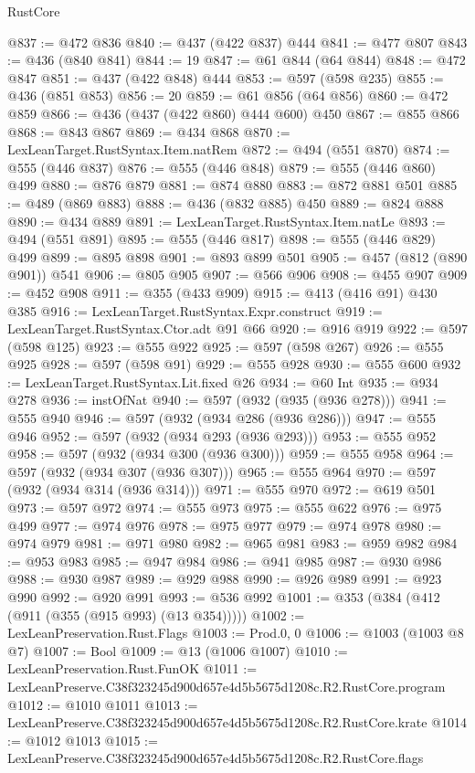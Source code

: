 \begin{lexlean}{RustCore}
\begin{coremodule}
@837 := @472 @836
@840 := @437 (@422 @837) @444
@841 := @477 @807
@843 := @436 (@840 @841)
@844 := 19
@847 := @61 @844 (@64 @844)
@848 := @472 @847
@851 := @437 (@422 @848) @444
@853 := @597 (@598 @235)
@855 := @436 (@851 @853)
@856 := 20
@859 := @61 @856 (@64 @856)
@860 := @472 @859
@866 := @436 (@437 (@422 @860) @444 @600) @450
@867 := @855 @866
@868 := @843 @867
@869 := @434 @868
@870 := LexLeanTarget.RustSyntax.Item.natRem
@872 := @494 (@551 @870)
@874 := @555 (@446 @837)
@876 := @555 (@446 @848)
@879 := @555 (@446 @860) @499
@880 := @876 @879
@881 := @874 @880
@883 := @872 @881 @501
@885 := @489 (@869 @883)
@888 := @436 (@832 @885) @450
@889 := @824 @888
@890 := @434 @889
@891 := LexLeanTarget.RustSyntax.Item.natLe
@893 := @494 (@551 @891)
@895 := @555 (@446 @817)
@898 := @555 (@446 @829) @499
@899 := @895 @898
@901 := @893 @899 @501
@905 := @457 (@812 (@890 @901)) @541
@906 := @805 @905
@907 := @566 @906
@908 := @455 @907
@909 := @452 @908
@911 := @355 (@433 @909)
@915 := @413 (@416 @91) @430 @385
@916 := LexLeanTarget.RustSyntax.Expr.construct
@919 := LexLeanTarget.RustSyntax.Ctor.adt @91 @66
@920 := @916 @919
@922 := @597 (@598 @125)
@923 := @555 @922
@925 := @597 (@598 @267)
@926 := @555 @925
@928 := @597 (@598 @91)
@929 := @555 @928
@930 := @555 @600
@932 := LexLeanTarget.RustSyntax.Lit.fixed @26
@934 := @60 Int
@935 := @934 @278
@936 := instOfNat
@940 := @597 (@932 (@935 (@936 @278)))
@941 := @555 @940
@946 := @597 (@932 (@934 @286 (@936 @286)))
@947 := @555 @946
@952 := @597 (@932 (@934 @293 (@936 @293)))
@953 := @555 @952
@958 := @597 (@932 (@934 @300 (@936 @300)))
@959 := @555 @958
@964 := @597 (@932 (@934 @307 (@936 @307)))
@965 := @555 @964
@970 := @597 (@932 (@934 @314 (@936 @314)))
@971 := @555 @970
@972 := @619 @501
@973 := @597 @972
@974 := @555 @973
@975 := @555 @622
@976 := @975 @499
@977 := @974 @976
@978 := @975 @977
@979 := @974 @978
@980 := @974 @979
@981 := @971 @980
@982 := @965 @981
@983 := @959 @982
@984 := @953 @983
@985 := @947 @984
@986 := @941 @985
@987 := @930 @986
@988 := @930 @987
@989 := @929 @988
@990 := @926 @989
@991 := @923 @990
@992 := @920 @991
@993 := @536 @992
@1001 := @353 (@384 (@412 (@911 (@355 (@915 @993) (@13 @354)))))
@1002 := LexLeanPreservation.Rust.Flags
@1003 := Prod.{0, 0}
@1006 := @1003 (@1003 @8 @7)
@1007 := Bool
@1009 := @13 (@1006 @1007)
@1010 := LexLeanPreservation.Rust.FunOK
@1011 := LexLeanPreserve.C38f323245d900d657e4d5b5675d1208c.R2.RustCore.program
@1012 := @1010 @1011
@1013 := LexLeanPreserve.C38f323245d900d657e4d5b5675d1208c.R2.RustCore.krate
@1014 := @1012 @1013
@1015 := LexLeanPreserve.C38f323245d900d657e4d5b5675d1208c.R2.RustCore.flags

\end{coremodule}
\end{lexlean}
